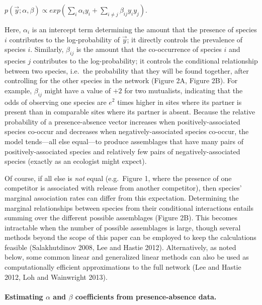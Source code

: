 \documentclass[12pt,]{article}
\begin{document}
\begin{spacing}{1.9}
\begin{flushleft}
\centering

\(p(\vec{y}; \alpha, \beta) \propto exp(\sum_{i}\alpha_i y_i + \sum_{i\neq j}\beta_{ij}y_i y_j).\)

\raggedright
\setlength{\parindent}{1em}

Here, \(\alpha_{i}\) is an intercept term determining the amount that
the presence of species \(i\) contributes to the log-probability of
\(\vec{y}\); it directly controls the prevalence of species \(i\).
Similarly, \(\beta_{ij}\) is the amount that the co-occurrence of
species \(i\) and species \(j\) contributes to the log-probability; it
controls the conditional relationship between two species, i.e.~the
probability that they will be found together, after controlling for the
other species in the network (Figure 2A, Figure 2B). For example,
\(\beta_{ij}\) might have a value of \(+2\) for two mutualists,
indicating that the odds of observing one species are \(e^2\) times
higher in sites where its partner is present than in comparable sites
where its partner is absent. Because the relative probability of a
presence-absence vector increases when positively-associated species
co-occur and decreases when negatively-associated species co-occur, the
model tends---all else equal---to produce assemblages that have many
pairs of positively-associated species and relatively few pairs of
negatively-associated species (exactly as an ecologist might expect).

Of course, if all else is \emph{not} equal (e.g.~Figure 1, where the
presence of one competitor is associated with release from another
competitor), then species' marginal association rates can differ from
this expectation. Determining the marginal relationships between species
from their conditional interactions entails summing over the different
possible assemblages (Figure 2B). This becomes intractable when the
number of possible assemblages is large, though several methods beyond
the scope of this paper can be employed to keep the calculations
feasible (Salakhutdinov 2008, Lee and Hastie 2012). Alternatively, as
noted below, some common linear and generalized linear methods can also
be used as computationally efficient approximations to the full network
(Lee and Hastie 2012, Loh and Wainwright 2013).

\paragraph{\texorpdfstring{Estimating \(\alpha\) and \(\beta\)
coefficients from presence-absence
data.}{Estimating \textbackslash{}alpha and \textbackslash{}beta coefficients from presence-absence data.}}\label{estimating-alpha-and-beta-coefficients-from-presence-absence-data.}


\end{flushleft}
\end{spacing}
\end{document}
